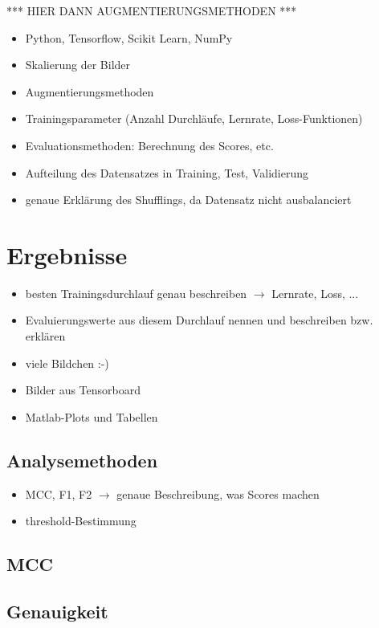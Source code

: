 \documentclass[a4paper, doc]{apa6}
\begin{document}
*** HIER DANN AUGMENTIERUNGSMETHODEN *** 




\begin{itemize}
	\item Python, Tensorflow, Scikit Learn, NumPy
	\item Skalierung der Bilder
	\item Augmentierungsmethoden
	\item Trainingsparameter (Anzahl Durchläufe, Lernrate, Loss-Funktionen)
	\item Evaluationsmethoden: Berechnung des Scores, etc.
	\item Aufteilung des Datensatzes in Training, Test, Validierung
	\item genaue Erklärung des Shufflings, da Datensatz nicht ausbalanciert
\end{itemize}

\section{Ergebnisse}
\begin{itemize}
	\item besten Trainingsdurchlauf genau beschreiben $\rightarrow$ Lernrate, Loss, ...
	\item Evaluierungswerte aus diesem Durchlauf nennen und beschreiben bzw. erklären
	\item viele Bildchen :-) 
	\item Bilder aus Tensorboard
	\item Matlab-Plots und Tabellen 
\end{itemize}

\subsection{Analysemethoden}

\begin{itemize}
	\item MCC, F1, F2 $\rightarrow$ genaue Beschreibung, was Scores machen 
	\item threshold-Bestimmung 
\end{itemize}

\subsection{MCC}

\subsection{Genauigkeit}
\end{document}
